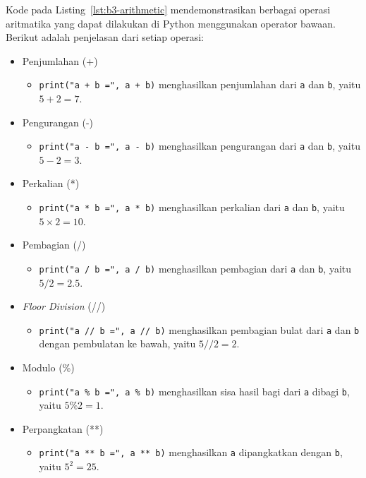 Kode pada Listing~\ref{lst:b3-arithmetic} mendemonstrasikan berbagai operasi aritmatika yang dapat dilakukan di Python menggunakan operator bawaan. Berikut adalah penjelasan dari setiap operasi:
\begin{itemize}
    \item Penjumlahan (+)
    \begin{itemize}
        \item \texttt{print("a + b =", a + b)} menghasilkan penjumlahan dari \texttt{a} dan \texttt{b}, yaitu $5 + 2 = 7$.
    \end{itemize}

    \item Pengurangan (-)
    \begin{itemize}
        \item \texttt{print("a - b =", a - b)} menghasilkan pengurangan dari \texttt{a} dan \texttt{b}, yaitu $5 - 2 = 3$.
    \end{itemize}

    \item Perkalian (*)
    \begin{itemize}
        \item \texttt{print("a * b =", a * b)} menghasilkan perkalian dari \texttt{a} dan \texttt{b}, yaitu $5 \times 2 = 10$.
    \end{itemize}

    \item Pembagian (/)
    \begin{itemize}
        \item \texttt{print("a / b =", a / b)} menghasilkan pembagian dari \texttt{a} dan \texttt{b}, yaitu $5 / 2 = 2.5$.
    \end{itemize}

    \item \textit{Floor Division} (//)
    \begin{itemize}
        \item \texttt{print("a // b =", a // b)} menghasilkan pembagian bulat dari \texttt{a} dan \texttt{b} dengan pembulatan ke bawah, yaitu $5 // 2 = 2$.
    \end{itemize}

    \item Modulo (\%)
    \begin{itemize}
        \item \texttt{print("a \% b =", a \% b)} menghasilkan sisa hasil bagi dari \texttt{a} dibagi \texttt{b}, yaitu $5 \% 2 = 1$.
    \end{itemize}

    \item Perpangkatan (**)
    \begin{itemize}
        \item \texttt{print("a ** b =", a ** b)} menghasilkan \texttt{a} dipangkatkan dengan \texttt{b}, yaitu $5^2 = 25$.
    \end{itemize}
\end{itemize}


